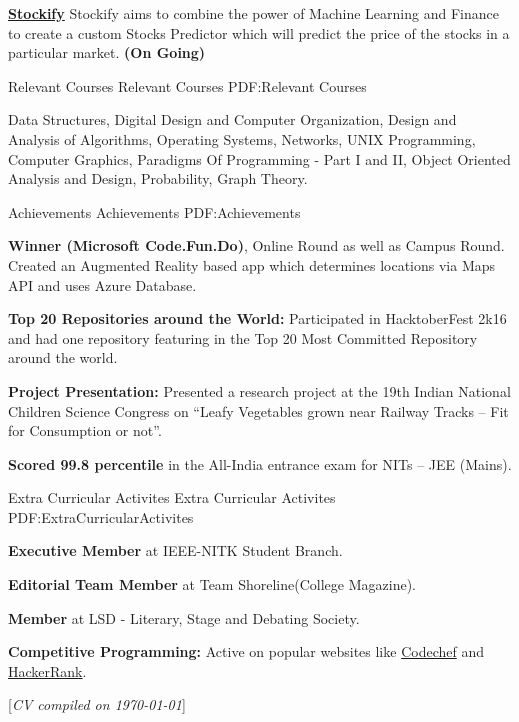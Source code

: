 \documentclass[letterpaper,MMMyyyy,nonstopmode]{simpleresumecv}
\newcommand{\CVNote}{CV compiled on {\today}}
\begin{document}
\begin{Body}
\BulletItem
\textcolor{blue}{
\href{https://github.com/salman-bhai/stocks-predictor}{\textbf{Stockify}}
}
Stockify aims to combine the power of Machine Learning and Finance to create a custom Stocks Predictor which will predict the price of the stocks in a particular market. 
{\textbf{(On Going)}}
\Gap

\BigGap

\Section
{Relevant Courses}
{Relevant Courses}
{PDF:Relevant Courses}

\Entry
Data Structures,
Digital Design and Computer Organization, Design and Analysis of Algorithms, Operating Systems, Networks, UNIX
Programming, Computer Graphics, Paradigms Of Programming - Part I and II, Object Oriented Analysis and Design, Probability, Graph Theory.


\Section
{Achievements}
{Achievements}
{PDF:Achievements}

\BulletItem
{\textbf{Winner (Microsoft Code.Fun.Do)}},
Online Round as well as Campus Round.
Created an Augmented Reality based app which determines locations via Maps API
and uses Azure Database.
\Gap

\BulletItem
{\textbf{Top 20 Repositories around the World:}}
Participated in HacktoberFest 2k16 and
had one repository featuring in the Top 20 Most Committed Repository around the
world.
\Gap


\BulletItem
{\textbf{Project Presentation: }}
Presented a research project at the 19th Indian National Children Science Congress on “Leafy Vegetables grown near Railway Tracks – Fit for Consumption or not”.
\Gap

\BulletItem
{\textbf{Scored 99.8 percentile }}
in the All-India entrance exam for NITs – JEE (Mains).\Gap


\Section
{Extra Curricular Activites}
{Extra Curricular Activites}
{PDF:ExtraCurricularActivites}

\BulletItem
{\textbf{Executive Member}}
at IEEE-NITK Student Branch.
\Gap

\BulletItem
{\textbf{Editorial Team Member}}
at Team Shoreline(College Magazine).
\Gap

\BulletItem
{\textbf{Member}}
at LSD - Literary, Stage and Debating Society.
\Gap


\BulletItem
{\textbf{Competitive Programming: }}
Active on popular websites like
\textcolor{blue}{
\href{https://www.codechef.com/users/sbshah}{Codechef}} and 
\textcolor{blue}{
\href{https://www.hackerrank.com/SalmanBhai}{HackerRank}}.

\Gap

\end{Body}


\UseNoteFont%
\null\hfill%
[\textit{\CVNote}]
\end{document}
